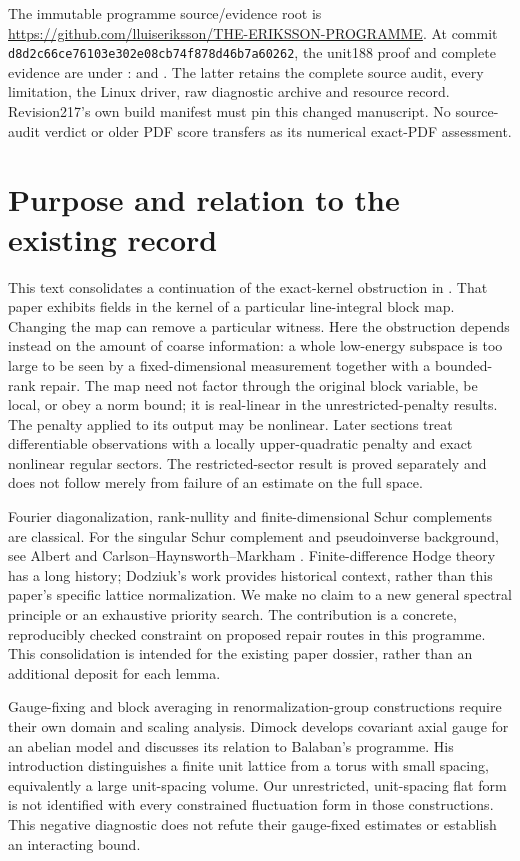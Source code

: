 \documentclass[11pt]{article}
\begin{document}
The immutable programme source/evidence root is
\url{https://github.com/lluiseriksson/THE-ERIKSSON-PROGRAMME}.
At commit \texttt{d8d2c66ce76103e302e08cb74f878d46b7a60262}, the unit188 proof and
complete evidence are under :
 and .
The latter retains the complete source audit, every limitation, the Linux driver,
raw diagnostic archive and resource record. Revision217's own build manifest must pin
this changed manuscript. No source-audit verdict or older PDF score transfers
as its numerical exact-PDF assessment.
\clearpage


\section{Purpose and relation to the existing record}
This text consolidates a continuation of the exact-kernel obstruction in
\cite{eriksson}. That paper exhibits fields in the kernel of a particular
line-integral block map. Changing the map can remove a particular witness.
Here the obstruction depends instead on the amount of coarse information:
a whole low-energy subspace is too large to be seen by a fixed-dimensional
measurement together with a bounded-rank repair. The map need not factor
through the original block variable, be local, or obey a norm bound; it is
real-linear in the unrestricted-penalty results. The penalty applied to its output may be nonlinear. Later sections treat differentiable observations with a locally upper-quadratic penalty and exact nonlinear regular sectors.
The restricted-sector result is proved separately and does not follow merely
from failure of an estimate on the full space.

Fourier diagonalization, rank-nullity and finite-dimensional Schur complements
are classical. For the singular Schur complement and pseudoinverse background,
see Albert and Carlson--Haynsworth--Markham \cite{albert,carlson}. Finite-difference Hodge theory has a long history; Dodziuk's
work \cite{dodziuk} provides historical context, rather than this paper's
specific lattice normalization. We make no claim to a new general spectral
principle or an exhaustive priority search. The contribution is a concrete,
reproducibly checked constraint on proposed repair routes in this programme.
This consolidation is intended for the existing paper dossier, rather than
an additional deposit for each lemma.

Gauge-fixing and block averaging in renormalization-group constructions
require their own domain and scaling analysis. Dimock \cite{dimock} develops
covariant axial gauge for an abelian model and discusses its relation to
Balaban's programme. His introduction distinguishes a finite unit lattice
from a torus with small spacing, equivalently a large unit-spacing volume.
Our unrestricted, unit-spacing flat form is not identified with every
constrained fluctuation form in those constructions. This negative diagnostic
does not refute their gauge-fixed estimates or establish an interacting bound.
\end{document}
